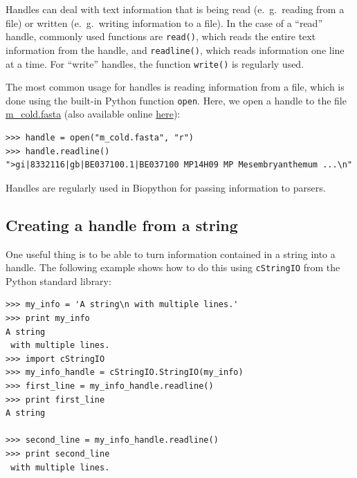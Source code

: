\documentclass{report}
\begin{document}
Handles can deal with text information that is being read (e.~g.~reading
from a file) or written (e.~g.~writing information to a file). In the
case of a ``read'' handle, commonly used functions are \verb|read()|,
which reads the entire text information from the handle, and
\verb|readline()|, which reads information one line at a time. For
``write'' handles, the function \verb|write()| is regularly used.

The most common usage for handles is reading information from a file,
which is done using the built-in Python function \verb|open|. Here, we open a
handle to the file \href{examples/m\_cold.fasta}{m\_cold.fasta}
(also available online
\href{http://biopython.org/DIST/docs/tutorial/examples/m\_cold.fasta}{here}):

\begin{verbatim}
>>> handle = open("m_cold.fasta", "r")
>>> handle.readline()
">gi|8332116|gb|BE037100.1|BE037100 MP14H09 MP Mesembryanthemum ...\n"
\end{verbatim}

Handles are regularly used in Biopython for passing information to parsers.

\subsection{Creating a handle from a string}

One useful thing is to be able to turn information contained in a
string into a handle. The following example shows how to do this using
\verb|cStringIO| from the Python standard library:

\begin{verbatim}
>>> my_info = 'A string\n with multiple lines.'
>>> print my_info
A string
 with multiple lines.
>>> import cStringIO
>>> my_info_handle = cStringIO.StringIO(my_info)
>>> first_line = my_info_handle.readline()
>>> print first_line
A string

>>> second_line = my_info_handle.readline()
>>> print second_line
 with multiple lines.
\end{verbatim}
\end{document}
